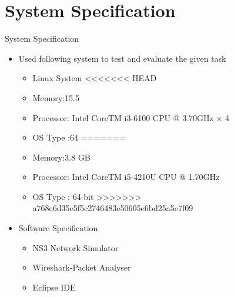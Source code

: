 \documentclass{beamer}
\begin{document}
\section{System Specification}
\begin{frame}{System Specification}
\begin{itemize}
  \item Used following system to test and evaluate the given task 
  \begin{itemize}
  	\item Linux System
<<<<<<< HEAD
  	\item Memory:\SI{15.5}{\giga\byte}
  	\item Processor: Intel CoreTM i3-6100 CPU @ 3.70GHz × 4 
  	\item OS Type :\SI{64}{\bit}
=======
  	\item Memory:3.8 GB
  	\item Processor: Intel CoreTM 		  i5-4210U CPU @ 1.70GHz
  	\item OS Type : 64-bit
>>>>>>> a768e6d35e5f5c2746483e50605e6bd25a5e7f09

  \end{itemize}
\item Software Specification
  \begin{itemize}
  	\item NS3 Network Simulator
  	\item Wireshark-Packet Analyser
  	\item Eclipse IDE
  \end{itemize}
\end{itemize}
\end{frame}
\end{document}
